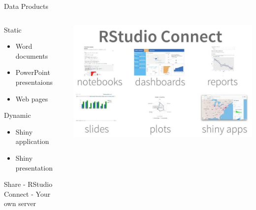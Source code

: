 \documentclass[
  ignorenonframetext,
]{beamer}
\providecommand{\tightlist}{%
  \setlength{\itemsep}{0pt}\setlength{\parskip}{0pt}}
\begin{document}
\begin{frame}{Data Products}
\protect\hypertarget{data-products}{}
\begin{columns}[T]
\begin{column}{0.48\textwidth}
Static

\begin{itemize}
\tightlist
\item
  Word documents
\item
  PowerPoint presentaions
\item
  Web pages
\end{itemize}

Dynamic

\begin{itemize}
\tightlist
\item
  Shiny application
\item
  Shiny presentation
\end{itemize}

Share - RStudio Connect - Your own server
\end{column}

\begin{column}{0.48\textwidth}
\includegraphics{images/rstudio_connect.jpg}
\end{column}
\end{columns}
\end{frame}
\end{document}
